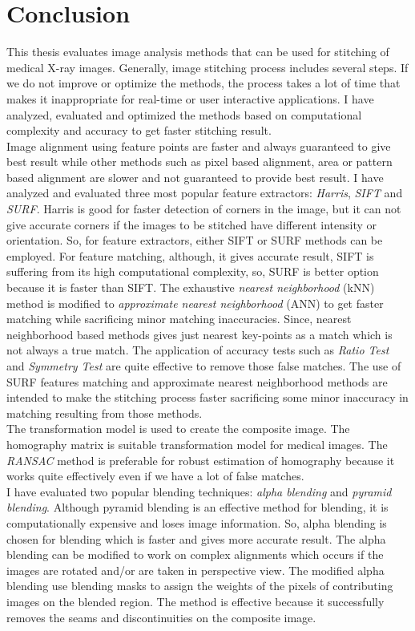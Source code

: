 \chapter{Conclusion}
This thesis evaluates image analysis methods that can be used for stitching of medical X-ray images. Generally, image stitching process includes several steps. If we do not improve or optimize the methods, the process takes a lot of time that makes it inappropriate for real-time or user interactive applications. I have analyzed, evaluated and optimized the methods based on computational complexity and accuracy to get faster stitching result.\\

\noindent Image alignment using feature points are faster and always guaranteed to give best result while other methods such as pixel based alignment, area or pattern based alignment are slower and not guaranteed to provide best result. I have analyzed and evaluated three most popular feature extractors: \emph{Harris}, \emph{SIFT} and \emph{SURF}. Harris is good for faster detection of corners in the image, but it can not give accurate corners if the images to be stitched have different intensity or orientation. So, for feature extractors, either SIFT or SURF methods can be employed. For feature matching, although, it gives accurate result, SIFT is suffering from its high computational complexity, so, SURF is better option because it is faster than SIFT. The exhaustive \emph{nearest neighborhood} (kNN) method is modified to \emph{approximate nearest neighborhood} (ANN) to get faster matching while sacrificing minor matching inaccuracies. Since, nearest neighborhood based methods gives just nearest key-points as a match which is not always a true match. The application of accuracy tests such as \emph{Ratio Test} and \emph{Symmetry Test} are quite effective to remove those false matches. The use of SURF features matching and approximate nearest neighborhood methods are intended to make the stitching process faster sacrificing some minor inaccuracy in matching resulting from those methods.\\ 

\noindent The transformation model is used to create the composite image. The homography matrix is suitable transformation model for medical images. The \emph{RANSAC} method is preferable for robust estimation of homography because it works quite effectively even if we have a lot of false matches.\\

\noindent I have evaluated two popular blending techniques: \emph{alpha blending} and \emph{pyramid blending}. Although pyramid blending is an effective method for blending, it is computationally expensive and loses image information. So, alpha blending is chosen for blending which is faster and gives more accurate result. The alpha blending can be modified to work on complex alignments which occurs if the images are rotated and/or are taken in perspective view. The modified alpha blending use blending masks to assign the weights of the pixels of contributing images on the blended region. The method is effective because it successfully removes the seams and discontinuities on the composite image.

 


